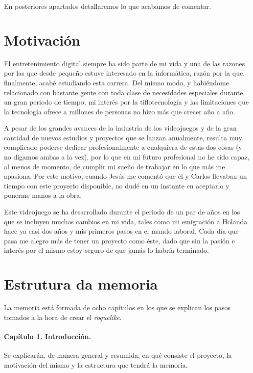 En posteriores apartados detallaremos lo que acabamos de comentar.

\section{Motivación}
El entretenimiento digital siempre ha sido parte de mi vida y una de las razones por las que desde pequeño estuve interesado en la informática, razón por la que, finalmente, acabé estudiando esta carrera. Del mismo modo, y habiéndome relacionado con bastante gente con toda clase de necesidades especiales durante un gran periodo de tiempo, mi interés por la tiflotecnología y las limitaciones que la tecnología ofrece a millones de personas no hizo más que crecer año a año.

A pesar de los grandes avances de la industria de los videojuegos y de la gran cantidad de nuevos estudios y proyectos que se lanzan anualmente, resulta muy complicado poderse dedicar profesionalmente a cualquiera de estas dos cosas (y no digamos ambas a la vez), por lo que en mi futuro profesional no he sido capaz, al menos de momento, de cumplir mi sueño de trabajar en lo que más me apasiona. Por este motivo, cuando Jesús me comentó que él y Carlos llevaban un tiempo con este proyecto disponible, no dudé en un instante en aceptarlo y ponerme manos a la obra.

Este videojuego se ha desarrollado durante el periodo de un par de años en los que se incluyen muchos cambios en mi vida, tales como mi emigración a Holanda hace ya casi dos años y mis primeros pasos en el mundo laboral. Cada día que pasa me alegro más de tener un proyecto como éste, dado que sin la pasión e interés por el mismo estoy seguro de que jamás lo habría terminado.

\section{Estrutura da memoria}

La memoria está formada de ocho capítulos en los que se explican los pasos tomados a la hora de crear el \textit{roguelike}.

\paragraph*{Capítulo 1. Introducción.}
Se explicarán, de manera general y resumida, en qué consiste el proyecto, la motivación del mismo y la estructura que tendrá la memoria.

